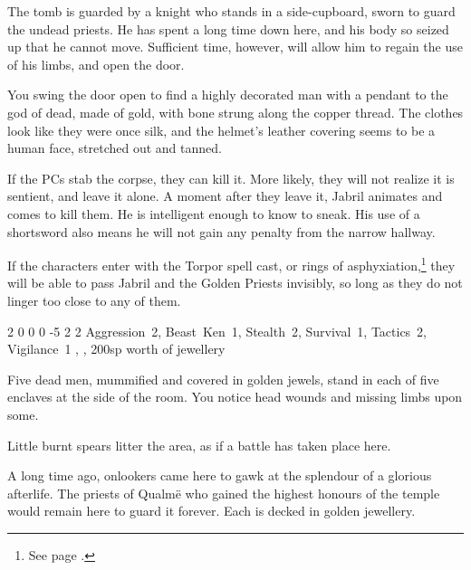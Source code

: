 \begin{multicols}{2}
The tomb is guarded by a knight who stands in a side-cupboard, sworn to guard the undead priests.
He has spent a long time down here, and his body so seized up that he cannot move.
Sufficient time, however, will allow him to regain the use of his limbs, and open the door.

\begin{boxtext}

	You swing the door open to find a highly decorated man with a pendant to the god of dead, made of gold, with bone strung along the copper thread.  The clothes look like they were once silk, and the helmet's leather covering seems to be a human face, stretched out and tanned.

\end{boxtext}

If the PCs stab the corpse, they can kill it.
More likely, they will not realize it is sentient, and leave it alone.
A moment after they leave it, Jabril animates and comes to kill them.
He is intelligent enough to know to sneak.
His use of a shortsword also means he will not gain any penalty from the narrow hallway.

If the characters enter with the Torpor spell cast, or rings of asphyxiation,\footnote{See page \pageref{ring_asphyxiation}.} they will be able to pass Jabril and the Golden Priests invisibly, so long as they do not linger too close to any of them.


	{2}%
	{0}%
	{{0}%
	{0}%
	{-5}}%
	{2}%
	{2}%
	{Aggression~2, Beast~Ken~1, Stealth~2, Survival~1, Tactics~2, Vigilance~1}%
	{\shortsword, \completeplate, 200sp worth of jewellery}%
	{}


\begin{boxtext}

	Five dead men, mummified and covered in golden jewels, stand in each of five enclaves at the side of the room.
	You notice head wounds and missing limbs upon some.

	Little burnt spears litter the area, as if a battle has taken place here.

\end{boxtext}

A long time ago, onlookers came here to gawk at the splendour of a glorious afterlife.  The priests of Qualm\"{e} who gained the highest honours of the temple would remain here to guard it forever.  Each is decked in golden jewellery.


\end{multicols}
